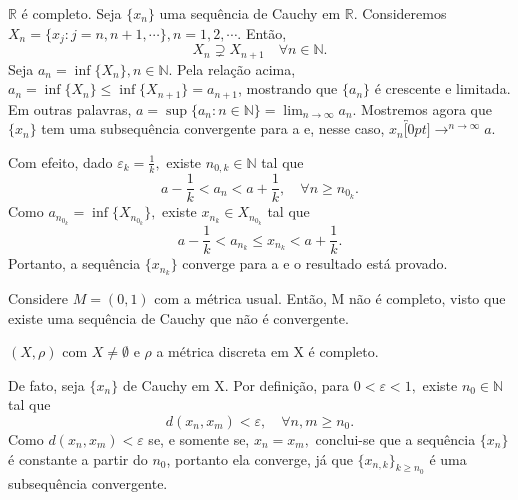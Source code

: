 \documentclass[MetricSpaces/metric_notes.tex]{subfiles}
\begin{document}
\begin{example}
	\(\mathbb{R}\) é completo. Seja \(\{x_{n}\}\) uma sequência de Cauchy em \(\mathbb{R}\). Consideremos \(X_{n}= \{x_{j}:j = n, n + 1, \cdots\}, n = 1, 2, \cdots\).
	Então,
	\[
		X_{n} \supsetneq{X_{n+1}}\quad \forall n\in \mathbb{N}.
	\]
	Seja \(a_{n} = \inf\{X_{n}\}, n\in \mathbb{N}.\) Pela relação acima, \(a_{n} = \inf\{X_{n}\}\leq \inf\{X_{n+1}\} = a_{n+1}\), mostrando que \(\{a_{n}\}\) é crescente e
	limitada. Em outras palavras, \(a = \sup\{a_{n}: n\in \mathbb{N}\} = \lim_{n\to \infty}a_{n}.\)
	Mostremos agora que \(\{x_{n}\}\) tem uma subsequência convergente para a e, nesse caso, \(x_{n}\overbracket[0pt]{\longrightarrow}^{n\to \infty}a.\)

	Com efeito, dado \(\varepsilon_{k} = \frac{1}{k},\) existe \(n_{0, k}\in \mathbb{N}\) tal que
	\[
		a-\frac{1}{k} < a_{n} < a + \frac{1}{k},\quad \forall n\geq n_{0_{k}}.
	\]
	Como \(a_{n_{0_{k}}}=\inf\{X_{n_{0_{k}}}\},\) existe \(x_{n_{k}}\in X_{n_{0_{k}}}\) tal que
	\[
		a - \frac{1}{k} < a_{n_{k}}\leq x_{n_{k}} < a + \frac{1}{k}.
	\]
	Portanto, a sequência \(\{x_{n_{k}}\}\) converge para a e o resultado está provado.
\end{example}
\begin{example}
	Considere \(M = (0, 1)\) com a métrica usual. Então, M não é completo, visto que existe uma sequência de Cauchy que não é convergente.
\end{example}
\begin{example}
	\((X, \rho )\) com \(X \neq\emptyset\) e \(\rho \) a métrica discreta em X é completo.

	De fato, seja \(\{x_{n}\}\) de Cauchy em X. Por definição, para \(0 < \varepsilon < 1,\) existe \(n_{0}\in \mathbb{N}\) tal que
	\[
		d(x_{n}, x_{m}) < \varepsilon, \quad \forall n,m\geq n_{0}.
	\]
	Como \(d(x_{n}, x_{m}) < \varepsilon \) se, e somente se, \(x_{n} = x_{m},\) conclui-se que a sequência \(\{x_{n}\}\) é constante a partir do \(n_{0}\),
	portanto ela converge, já que \(\{x_{n, k}\}_{k\geq n_{0}}\) é uma subsequência convergente.
\end{example}
\end{document}
